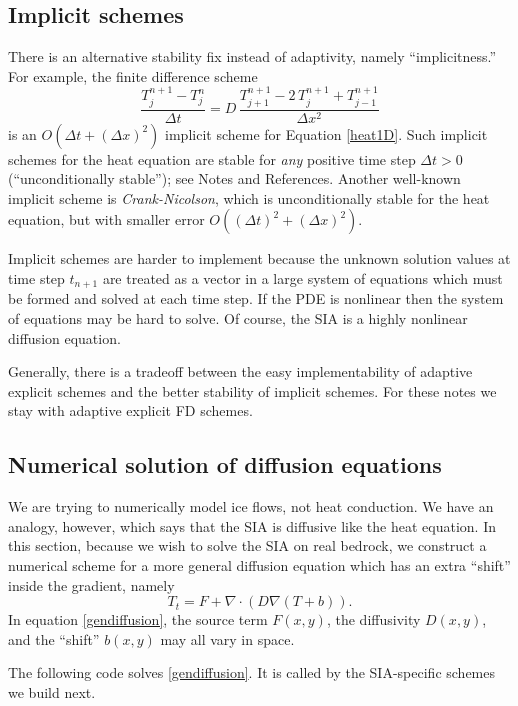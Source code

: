 \documentclass[letterpaper,final,12pt,reqno]{amsart}
\newcommand{\grad}{\nabla}
\newcommand{\Div}{\nabla\cdot}
\begin{document}
\subsection*{Implicit schemes}  There is an alternative stability fix instead of adaptivity, namely ``implicitness.''  For example, the finite difference scheme
\begin{equation}
  \frac{T_j^{n+1} - T_j^n}{\Delta t} = D\,\frac{T_{j+1}^{n+1} - 2\, T_j^{n+1} + T_{j-1}^{n+1}}{\Delta x^2} \label{implicit1D}
\end{equation}
is an $O(\Delta t + (\Delta x)^2)$ implicit scheme for Equation \eqref{heat1D}.  Such implicit schemes for the heat equation are stable for \emph{any} positive time step $\Delta t>0$ (``unconditionally stable''); see Notes and References.  Another well-known implicit scheme is \emph{Crank-Nicolson}, which is unconditionally stable for the heat equation, but with smaller error $O((\Delta t)^2 +(\Delta x)^2)$.

Implicit schemes are harder to implement because the unknown solution values at time step $t_{n+1}$ are treated as a vector in a large system of equations which must be formed and solved at each time step.  If the PDE is nonlinear then the system of equations may be hard to solve.  Of course, the SIA is a highly nonlinear diffusion equation.

Generally, there is a tradeoff between the easy implementability of adaptive explicit schemes and the better stability of implicit schemes.  For these notes we stay with adaptive explicit FD schemes.

\subsection*{Numerical solution of diffusion equations}  We are trying to numerically model ice flows, not heat conduction.  We have an analogy, however, which says that the SIA is diffusive like the heat equation.  In this section, because we wish to solve the SIA on real bedrock, we construct a numerical scheme for a more general diffusion equation which has an extra ``shift'' inside the gradient, namely
\begin{equation}
  T_t = F + \Div \left(D \grad (T + b)\right). \label{gendiffusion}
\end{equation}
In equation \eqref{gendiffusion}, the source term $F(x,y)$, the diffusivity $D(x,y)$, and the ``shift'' $b(x,y)$ may all vary in space.

The following code solves \eqref{gendiffusion}.  It is called by the SIA-specific schemes we build next.
\end{document}
